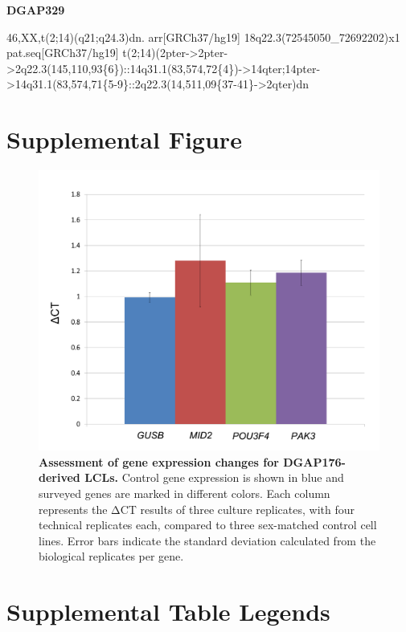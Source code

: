 \documentclass[a4paper,twoside=true,openright,parskip=full,chapterprefix=true,11pt,headings=normal,bibliography=totoc,listof=totoc,titlepage=on,captions=tableabove,draft=false]{scrreprt}
\theoremstyle{definition}
\theoremstyle{definition}
\theoremstyle{definition}
\theoremstyle{remark}
\begin{document}
\textbf{DGAP329}

46,XX,t(2;14)(q21;q24.3)dn. arr{[}GRCh37/hg19{]}
18q22.3(72545050\_72692202)x1 pat.seq{[}GRCh37/hg19{]}
t(2;14)(2pter-\textgreater{}2pter-\textgreater{}2q22.3(145,110,93\{6\})::14q31.1(83,574,72\{4\})-\textgreater{}14qter;14pter-\textgreater{}14q31.1(83,574,71\{5-9\}::2q22.3(14,511,09\{37-41\}-\textgreater{}2qter)dn

\hypertarget{supplemental-figure}{%
\section{Supplemental Figure}\label{supplemental-figure}}

\begin{figure}

{\centering \includegraphics[width=0.6\linewidth]{figures/position_effect/FigureS1} 

}

\caption{\textbf{Assessment of gene expression changes
for DGAP176-derived LCLs.} Control gene expression is shown in blue and
surveyed genes are marked in different colors. Each column represents
the ΔCT results of three culture replicates, with four technical
replicates each, compared to three sex-matched control cell lines. Error
bars indicate the standard deviation calculated from the biological
replicates per gene.}\label{fig:position-effect-S1}
\end{figure}









\hypertarget{position-effect-sub-tab}{%
\section{Supplemental Table Legends}\label{position-effect-sub-tab}}
\end{document}
